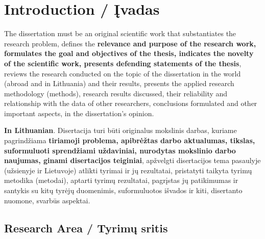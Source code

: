     

\chapter*{Introduction / Įvadas}
\label{cha:intro}

The dissertation must be an original scientific work that substantiates the research problem, defines the \textbf{relevance and purpose of the research work, formulates the goal and objectives of the thesis, indicates the novelty of the scientific work, presents defending statements of the thesis}, reviews the research conducted on the topic of the dissertation in the world (abroad and in Lithuania) and their results, presents the applied research methodology (methods), research results discussed, their reliability and relationship with the data of other researchers, conclusions formulated and other important aspects, in the dissertation's opinion.


\textbf{In Lithuanian}. Disertacija turi būti originalus mokslinis darbas, kuriame pagrindžiama \textbf{tiriamoji problema, apibrėžtas darbo aktualumas, tikslas, suformuluoti sprendžiami uždaviniai, nurodytas mokslinio darbo naujumas, ginami disertacijos teiginiai}, apžvelgti disertacijos tema pasaulyje (užsienyje ir Lietuvoje) atlikti tyrimai ir jų rezultatai, pristatyti taikyta tyrimų metodika (metodai), aptarti tyrimų rezultatai, pagrįstas jų patikimumas ir santykis su kitų tyrėjų duomenimis, suformuluotos išvados ir kiti, disertanto nuomone, svarbūs aspektai.


\section*{Research Area / Tyrimų sritis}

